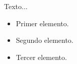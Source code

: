 Texto... \pause
\begin{itemize}
    \item Primer elemento. \pause
    \item Segundo elemento. \pause
    \item Tercer elemento. \pause
\end{itemize}